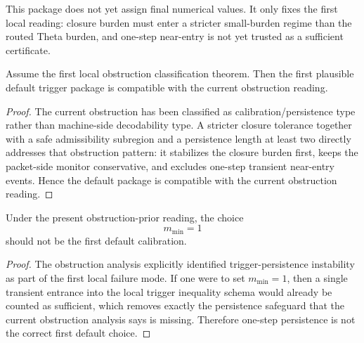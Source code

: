 \begin{remark}
\label{rem:interpretation-of-the-default-package}
This package does not yet assign final numerical values.
It only fixes the first local reading:
closure burden must enter a stricter small-burden regime than the routed Theta burden, and one-step near-entry is not yet trusted as a sufficient certificate.
\end{remark}

\begin{proposition}
\label{prop:default-local-trigger-package-is-obstruction-compatible}
Assume the first local obstruction classification theorem.
Then the first plausible default trigger package is compatible with the current obstruction reading.
\end{proposition}

\begin{proof}
The current obstruction has been classified as calibration/persistence type rather than machine-side decodability type.
A stricter closure tolerance together with a safe admissibility subregion and a persistence length at least two directly addresses that obstruction pattern: it stabilizes the closure burden first, keeps the packet-side monitor conservative, and excludes one-step transient near-entry events.
Hence the default package is compatible with the current obstruction reading.
\end{proof}

\begin{proposition}
\label{prop:why-one-step-persistence-should-not-be-the-default}
Under the present obstruction-prior reading, the choice
\[
m_{\min}=1
\]
should not be the first default calibration.
\end{proposition}

\begin{proof}
The obstruction analysis explicitly identified trigger-persistence instability as part of the first local failure mode.
If one were to set \(m_{\min}=1\), then a single transient entrance into the local trigger inequality schema would already be counted as sufficient, which removes exactly the persistence safeguard that the current obstruction analysis says is missing.
Therefore one-step persistence is not the correct first default choice.
\end{proof}

